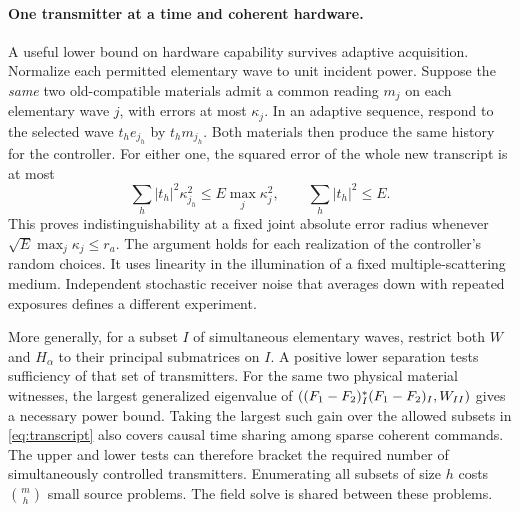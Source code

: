 \paragraph{One transmitter at a time and coherent hardware.}
A useful lower bound on hardware capability survives adaptive acquisition. Normalize each permitted elementary wave to unit incident power. Suppose the \emph{same} two old-compatible materials admit a common reading $m_j$ on each elementary wave $j$, with errors at most $\kappa_j$. In an adaptive sequence, respond to the selected wave $t_h e_{j_h}$ by $t_h m_{j_h}$. Both materials then produce the same history for the controller. For either one, the squared error of the whole new transcript is at most
\begin{equation}
   \sum_h |t_h|^2\kappa_{j_h}^2
      \leq E\max_j\kappa_j^2,\qquad \sum_h|t_h|^2\leq E.     \label{eq:transcript}
\end{equation}
This proves indistinguishability at a fixed joint absolute error radius whenever $\sqrt E\max_j\kappa_j\leq r_a$. The argument holds for each realization of the controller's random choices. It uses linearity in the illumination of a fixed multiple-scattering medium. Independent stochastic receiver noise that averages down with repeated exposures defines a different experiment.

More generally, for a subset $I$ of simultaneous elementary waves, restrict both $W$ and $H_\alpha$ to their principal submatrices on $I$. A positive lower separation tests sufficiency of that set of transmitters. For the same two physical material witnesses, the largest generalized eigenvalue of $((F_1-F_2)_I^{\ast}(F_1-F_2)_I,W_{II})$ gives a necessary power bound. Taking the largest such gain over the allowed subsets in \eqref{eq:transcript} also covers causal time sharing among sparse coherent commands. The upper and lower tests can therefore bracket the required number of simultaneously controlled transmitters. Enumerating all subsets of size $h$ costs $\binom{m}{h}$ small source problems. The field solve is shared between these problems.
